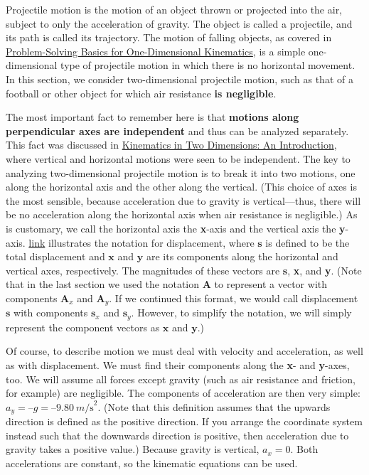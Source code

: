 \documentclass[
]{book}
\begin{document}
\protect\hypertarget{import-auto-id1560216}{}{Projectile motion} is the
\protect\hypertarget{import-auto-id1846113}{}{motion} of an object thrown or
projected into the air, subject to only the acceleration of gravity. The
object is called a \protect\hypertarget{import-auto-id1809247}{}{projectile}, and its path is called its
\protect\hypertarget{import-auto-id1397020}{}{trajectory}. The motion of
falling objects, as covered in \href{/m54774}{Problem-Solving Basics for
One-Dimensional Kinematics}, is a simple one-dimensional type
of projectile motion in which there is no horizontal movement. In this
section, we consider two-dimensional projectile motion, such as that of
a football or other object for which \protect\hypertarget{import-auto-id1230666}{}{air
resistance} \textbf{is negligible}.

The most important fact to remember here is that \textbf{motions along
perpendicular axes are independent} and thus can be analyzed
separately. This fact was discussed in \href{/m54779}{Kinematics in Two Dimensions: An
Introduction}, where vertical and horizontal motions were seen
to be independent. The key to analyzing two-dimensional projectile
motion is to break it into two motions, one along the horizontal axis
and the other along the vertical. (This choice of axes is the most
sensible, because acceleration due to gravity is vertical---thus, there
will be no acceleration along the horizontal axis when air resistance is
negligible.) As is customary, we call the horizontal axis the \textbf{x}-axis
and the vertical axis the \textbf{y}-axis.
\protect\hyperlink{import-auto-id2242290}{link} illustrates the
notation for displacement, where \(\mathbf{s}{}\) is defined to be the
total displacement and \(\mathbf{x}{}\) and \(\mathbf{y}{}\) are its
components along the horizontal and vertical axes, respectively. The
magnitudes of these vectors are \textbf{s}, \textbf{x}, and \textbf{y}. (Note that in
the last section we used the notation \(\mathbf{A}{}\) to represent a
vector with components \(\mathbf{A}_{x}{}\) and \(\mathbf{A}_{y}{}\). If we
continued this format, we would call displacement \(\mathbf{s}{}\) with
components \(\mathbf{s}_{x}{}\) and \(\mathbf{s}_{y}{}\). However, to
simplify the notation, we will simply represent the component vectors as
\(\mathbf{x}{}\) and \(\mathbf{y}{}\).)

Of course, to describe motion we must deal with velocity and
acceleration, as well as with displacement. We must find their
components along the \textbf{x}- and \textbf{y}-axes, too. We will assume all
forces except gravity (such as air resistance and friction, for example)
are negligible. The components of acceleration are then very simple:
\({{a_{y} = –g} = –9.80\ m\text{/s}^{2}}{}\). (Note that this definition
assumes that the upwards direction is defined as the positive direction.
If you arrange the coordinate system instead such that the downwards
direction is positive, then acceleration due to gravity takes a positive
value.) Because gravity is vertical, \({a_{x} = 0}{}\). Both accelerations
are constant, so the kinematic equations can be used.
\end{document}

